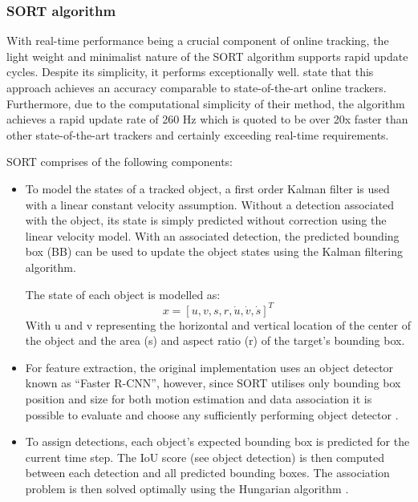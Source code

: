 \documentclass[a4paper,twoside,12pt]{report}
\begin{document}
\subsubsection{SORT algorithm}

With real-time performance being a crucial component of online tracking, the light weight and minimalist nature of the SORT algorithm supports rapid update cycles. Despite its simplicity, it performs exceptionally well. \cite{sort} state that this approach achieves an accuracy comparable to state-of-the-art online trackers. Furthermore, due to the computational simplicity of their method, the algorithm achieves a rapid update rate of 260 Hz which is quoted to be over 20x faster than other state-of-the-art trackers and certainly exceeding real-time requirements.

SORT comprises of the following components:
\begin{itemize}
	\item To model the states of a tracked object, a first order Kalman filter is used with a linear constant velocity assumption. Without a detection associated with the object, its state is simply predicted without correction using the linear velocity model. With an associated detection, the predicted bounding box (BB) can be used to update the object states using the Kalman filtering algorithm.

	The state of each object is modelled as:
\begin{equation}
x = [u,v,s,r,\dot{u},\dot{v},\dot{s}]^T
\end{equation}
With u and v representing the horizontal and vertical location of the center of the object and the area (s) and aspect ratio (r) of the target’s bounding box.

	\item For feature extraction, the original implementation uses an object detector known as ``Faster R-CNN'', however, since SORT utilises only bounding box position and size for both motion estimation and data association it is possible to evaluate and choose any sufficiently performing object detector \citep{sort}.
	\item To assign detections, each object's expected bounding box is predicted for the current time step. The IoU score (see object detection) is then computed between each detection and all predicted bounding boxes. The association problem is then solved optimally using the Hungarian algorithm \citep{hungarian}.
\end{itemize}
\end{document}

